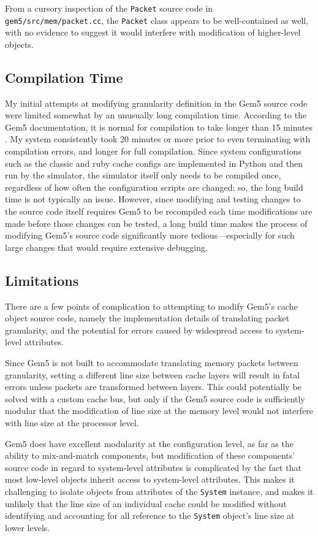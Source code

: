 \documentclass[12pt,twoside]{reedthesis}
\begin{document}
	From a cursory inspection of the \verb`Packet` source code in \verb`gem5/src/mem/packet.cc`, the \verb`Packet` class appears to be well-contained as well, with no evidence to suggest it would interfere with modification of higher-level objects.

	\subsection*{Compilation Time}

	My initial attempts at modifying granularity definition in the Gem5 source code were limited somewhat by an unusually long compilation time. According to the Gem5 documentation, it is normal for compilation to take longer than 15 minutes \cite{gem5-build}. My system consistently took 20 minutes or more prior to even terminating with compilation errors, and longer for full compilation. Since system configurations such as the classic and ruby cache configs are implemented in Python and then run by the simulator, the simulator itself only needs to be compiled once, regardless of how often the configuration scripts are changed; so, the long build time is not typically an issue. However, since modifying and testing changes to the source code itself requires Gem5 to be recompiled each time modifications are made before those changes can be tested, a long build time makes the process of modifying Gem5's source code significantly more tedious---especially for such large changes that would require extensive debugging.

	\subsection*{Limitations}

	There are a few points of complication to attempting to modify Gem5's cache object source code, namely the implementation details of translating packet granularity, and the potential for errors caused by widespread access to system-level attributes.
	
	Since Gem5 is not built to accommodate translating memory packets between granularity, setting a different line size between cache layers will result in fatal errors unless packets are transformed between layers. This could potentially be solved with a custom cache bus, but only if the Gem5 source code is sufficiently modular that the modification of line size at the memory level would not interfere with line size at the processor level.
	
	Gem5 does have excellent modularity at the configuration level, as far as the ability to mix-and-match components, but modification of these components' source code in regard to system-level attributes is complicated by the fact that most low-level objects inherit access to system-level attributes. This makes it challenging to isolate objects from attributes of the \verb`System` instance, and makes it unlikely that the line size of an individual cache could be modified without identifying and accounting for all reference to the \verb`System` object's line size at lower levels.
\end{document}
